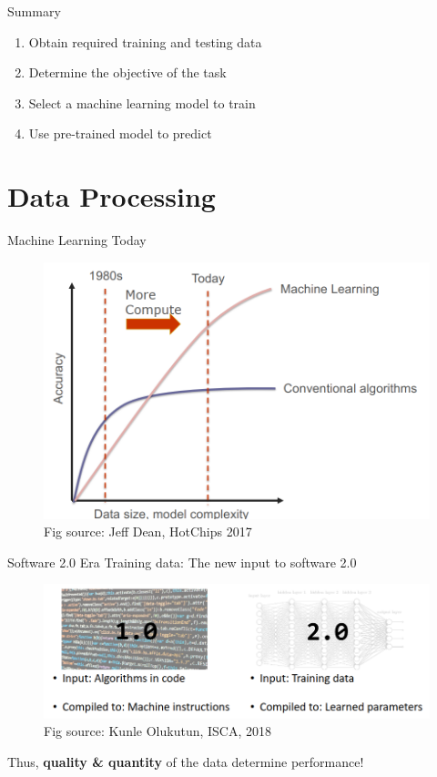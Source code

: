 \documentclass{../TexTemplate/myslide}
\begin{document}
\begin{frame}{Summary}
\begin{enumerate}
	\item Obtain required training and testing data
	\item Determine the objective of the task
	\item Select a machine learning model to train
	\item Use pre-trained model to predict
\end{enumerate}
\end{frame}

\section{Data Processing}
\begin{frame}
\sectionpage
\end{frame}

\begin{frame}{Machine Learning Today}
\begin{figure}
\centering
\includegraphics[width=0.8\linewidth]{fig/ml_today.png}
\caption*{\small Fig source: Jeff Dean, HotChips 2017}
\end{figure}
\end{frame}

\begin{frame}{Software 2.0 Era}
Training data: The new input to software 2.0
\begin{figure}
\centering
\includegraphics[width=0.9\linewidth]{fig/software2.png}
\caption*{\small Fig source: Kunle Olukutun, ISCA, 2018}
\end{figure}
Thus, \textbf{quality \& quantity} of the data determine performance!
\end{frame}
\end{document}
